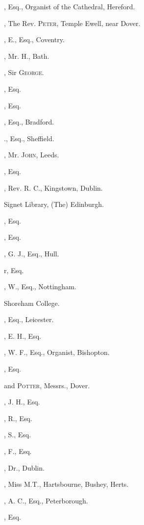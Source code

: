 \begin{multicols}{2}
, Esq., Organist of the
Cathedral, Hereford.
\pagebreak

, The Rev. \textsc{Peter}, Temple Ewell,
near Dover.

, E., Esq., Coventry.

, Mr. H., Bath.

, Sir \textsc{George}.

, Esq.

, Esq.

, Esq., Bradford.

., Esq., Sheffield.

, Mr. \textsc{John}, Leeds.

, Esq.

, Rev. R. C., Kingstown, Dublin.

Signet Library, (The) Edinburgh.

, Esq.

, Esq.

, G. J., Esq., Hull.

r, Esq.

, W., Esq., Nottingham.

Shoreham College.

, Esq., Leicester.

, E. H., Esq.

, W. F., Esq., Organist, Bishopton.

, Esq.

 and \textsc{Potter}, Messrs., Dover.

, J. H., Esq.

, R., Esq.

, S., Esq.

, F., Esq.

, Dr., Dublin.
\bigskip

, Miss M.T., Hartsbourne, Bushey,
Herts.

, A. C., Esq., Peterborough.

, Esq.


\end{multicols}
